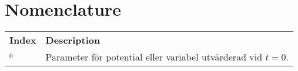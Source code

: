 \chapter*{Nomenclature}

{\centering
\begin{longtabu}{X[2cm,l] X[8cm,p,l]}


\\
\textbf{Index} & \textbf{Description}\\
$_0$ & Parameter för potential eller variabel utvärderad vid $t = 0$. \\

\end{longtabu}}

